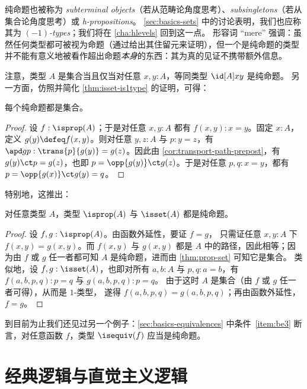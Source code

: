 纯命题也被称为 \emph{subterminal objects}（若从范畴论角度思考）、\emph{subsingletons}（若从集合论角度思考）或 \emph{h-propositions}。
%
%
%
\cref{sec:basics-sets} 中的讨论表明，我们也应称其为 \emph{$(-1)$-types}；我们将在 \cref{cha:hlevels} 回到这一点。
形容词 ``mere'' 强调：虽然任何类型都可被视为命题（通过给出其住留元来证明），但一个是纯命题的类型并不能有意义地被看作超出命题\emph{本身}的东西：其为真的见证不携带额外信息。

注意，类型 $A$ 是集合当且仅当对任意 $x,y:A$，等同类型 $\id[A]xy$ 是纯命题。
另一方面，仿照并简化 \cref{thm:isset-is1type} 的证明，可得：

\begin{lem}\label{thm:prop-set}
  每个纯命题都是集合。
\end{lem}
\begin{proof}
  设 $f:\isprop(A)$；于是对任意 $x,y:A$ 都有 $f(x,y):x=y$。固定 $x:A$，
  定义 $g(y)\defeq f(x,y)$。则对任意 $y,z:A$ 与 $p:y=z$，有 $\apd
  g p : \trans{p}{g(y)}={g(z)}$。因此由 \cref{cor:transport-path-prepost}，有
  $g(y)\ct p = g(z)$，也即 $p=\opp{g(y)}\ct g(z)$。于是对任意
  $p,q:x=y$，都有 $p = \opp{g(x)}\ct g(y) = q$。
\end{proof}

特别地，这推出：

\begin{lem}\label{thm:isprop-isprop}\label{thm:isprop-isset}
  对任意类型 $A$，类型 $\isprop(A)$ 与 $\isset(A)$ 都是纯命题。
\end{lem}
\begin{proof}
  设 $f,g:\isprop(A)$。由函数外延性，要证 $f=g$，
  只需证任意 $x,y:A$ 下 $f(x,y)=g(x,y)$。而 $f(x,y)$ 与 $g(x,y)$
  都是 $A$ 中的路径，因此相等；因为由 $f$ 或 $g$ 任一者都可知
  $A$ 是纯命题，进而由 \cref{thm:prop-set} 可知它是集合。
  类似地，设 $f,g:\isset(A)$，也即对所有
  $a,b:A$ 与 $p,q:a=b$，有 $f(a,b,p,q):p=q$ 与 $g(a,b,p,q):p=q$。
  由于这时 $A$ 是集合（由 $f$ 或 $g$ 任一者可得），从而是 $1$-类型，
  遂得 $f(a,b,p,q)=g(a,b,p,q)$；再由函数外延性，$f=g$。
\end{proof}

到目前为止我们还见过另一个例子：\cref{sec:basics-equivalences} 中条件~\ref{item:be3} 断言，对任意函数 $f$，类型 $\isequiv (f)$ 应当是纯命题。

%
%
\section{经典逻辑与直觉主义逻辑}
\label{sec:intuitionism}

